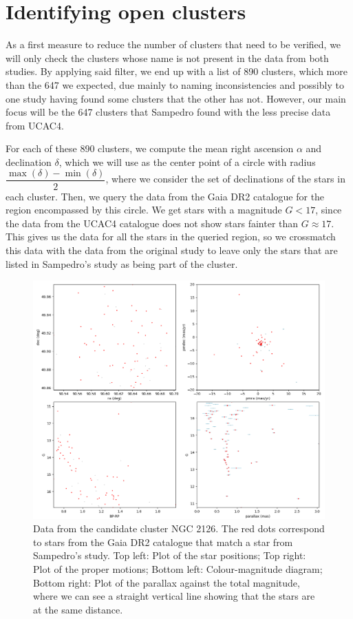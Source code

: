 \documentclass[twocolumn]{revtex4}
\begin{document}
\section{Identifying open clusters}

As a first measure to reduce the number of clusters that need to be verified, we will only check the clusters whose name is not present in the data from both studies. By applying said filter, we end up with a list of 890 clusters, which more than the 647 we expected, due mainly to naming inconsistencies and possibly to one study having found some clusters that the other has not. However, our main focus will be the 647 clusters that Sampedro found with the less precise data from UCAC4.

For each of these 890 clusters, we compute the mean right ascension $\alpha$ and declination $\delta$, which we will use as the center point of a circle with radius $\dfrac{\max(\delta) - \min(\delta)}{2}$, where we consider the set of declinations of the stars in each cluster. Then, we query the data from the Gaia DR2 catalogue for the region encompassed by this circle. We get stars with a magnitude $G < 17$, since the data from the UCAC4 catalogue does not show stars fainter than $G \approx 17$. This gives us the data for all the stars in the queried region, so we crossmatch this data with the data from the original study to leave only the stars that are listed in Sampedro's study as being part of the cluster.

\begin{figure}
\centering
\includegraphics[scale=0.5]{NGC_2126_crossmatch}
\caption{Data from the candidate cluster NGC 2126. The red dots correspond to stars from the Gaia DR2 catalogue that match a star from Sampedro's study.
Top left: Plot of the star positions; Top right: Plot of the proper motions; Bottom left: Colour-magnitude diagram; Bottom right: Plot of the parallax against the total magnitude, where we can see a straight vertical line showing that the stars are at the same distance.}
\label{crossmatched_data}
\end{figure}
\end{document}
